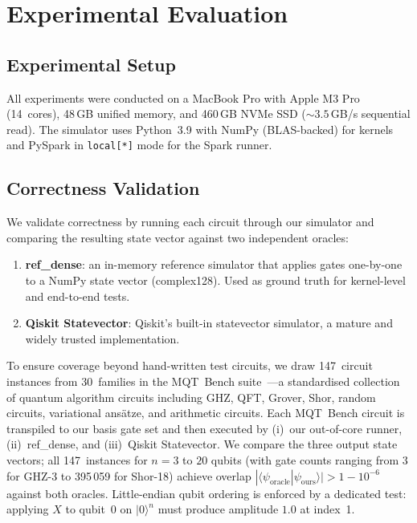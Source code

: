 \section{Experimental Evaluation}
\label{sec:results}

\subsection{Experimental Setup}
All experiments were conducted on a MacBook Pro with Apple M3 Pro
(14~cores), 48\,GB unified memory, and 460\,GB NVMe SSD
(${\sim}3.5$\,GB/s sequential read). The simulator uses Python~3.9
with NumPy (BLAS-backed) for kernels and PySpark in
\texttt{local[*]} mode for the Spark runner.

\subsection{Correctness Validation}
\label{sec:correctness}

We validate correctness by running each circuit through our simulator
and comparing the resulting state vector against two independent
oracles:
\begin{enumerate}
  \item \textbf{ref\_dense}: an in-memory reference simulator that
    applies gates one-by-one to a NumPy state vector (complex128).
    Used as ground truth for kernel-level and end-to-end tests.
  \item \textbf{Qiskit Statevector}: Qiskit's built-in statevector
    simulator, a mature and widely trusted implementation.
\end{enumerate}
To ensure coverage beyond hand-written test circuits, we draw
147~circuit instances from 30~families in the MQT~Bench
suite~\cite{mqtbench}---a standardised collection of quantum
algorithm circuits including GHZ, QFT, Grover, Shor, random circuits,
variational ans\"{a}tze, and arithmetic circuits. Each MQT~Bench
circuit is transpiled to our basis gate set and then executed by
(i)~our out-of-core runner, (ii)~ref\_dense, and (iii)~Qiskit
Statevector. We compare the three output state vectors; all
147~instances for $n = 3$ to $20$ qubits (with gate counts ranging
from 3 for GHZ-3 to 395\,059 for Shor-18) achieve overlap
$|\langle\psi_{\text{oracle}}|\psi_{\text{ours}}\rangle| > 1 -
10^{-6}$ against both oracles. Little-endian qubit ordering is
enforced by a dedicated test: applying $X$ to qubit~0 on
$|0\rangle^n$ must produce amplitude $1.0$ at index~1.

